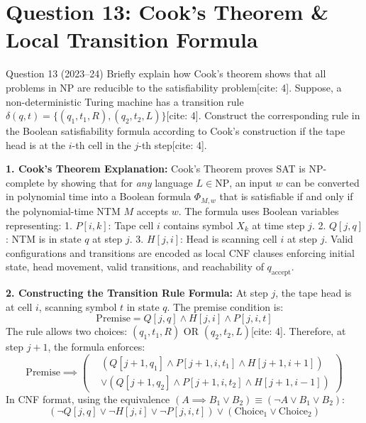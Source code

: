 \documentclass[11pt,a4paper]{article}
\begin{document}
\section{Question 13: Cook's Theorem \& Local Transition Formula}
\begin{questionbox}{Question 13 (2023--24)}
Briefly explain how Cook's theorem shows that all problems in NP are reducible to the satisfiability problem[cite: 4]. Suppose, a non-deterministic Turing machine has a transition rule $\delta(q, t) = \{(q_1, t_1, R), (q_2, t_2, L)\}$[cite: 4]. Construct the corresponding rule in the Boolean satisfiability formula according to Cook's construction if the tape head is at the $i$-th cell in the $j$-th step[cite: 4].
\end{questionbox}

\begin{solutionbox}
\textbf{1. Cook's Theorem Explanation:}
Cook's Theorem proves SAT is NP-complete by showing that for \textit{any} language $L \in \text{NP}$, an input $w$ can be converted in polynomial time into a Boolean formula $\Phi_{M, w}$ that is satisfiable if and only if the polynomial-time NTM $M$ accepts $w$. The formula uses Boolean variables representing:
1. $P[i, k]$: Tape cell $i$ contains symbol $X_k$ at time step $j$.
2. $Q[j, q]$: NTM is in state $q$ at step $j$.
3. $H[j, i]$: Head is scanning cell $i$ at step $j$.
Valid configurations and transitions are encoded as local CNF clauses enforcing initial state, head movement, valid transitions, and reachability of $q_{\text{accept}}$.

\textbf{2. Constructing the Transition Rule Formula:}
At step $j$, the tape head is at cell $i$, scanning symbol $t$ in state $q$. The premise condition is:
$$\text{Premise} = Q[j, q] \land H[j, i] \land P[j, i, t]$$
The rule allows two choices: $(q_1, t_1, R)$ OR $(q_2, t_2, L)$[cite: 4]. Therefore, at step $j+1$, the formula enforces:
$$\text{Premise} \implies \left( \begin{aligned}
& (Q[j+1, q_1] \land P[j+1, i, t_1] \land H[j+1, i+1]) \\
& \lor (Q[j+1, q_2] \land P[j+1, i, t_2] \land H[j+1, i-1])
\end{aligned} \right)$$
In CNF format, using the equivalence $(A \implies B_1 \lor B_2) \equiv (\neg A \lor B_1 \lor B_2)$:
$$(\neg Q[j, q] \lor \neg H[j, i] \lor \neg P[j, i, t]) \lor \left( \text{Choice}_1 \lor \text{Choice}_2 \right)$$
\end{solutionbox}

\end{document}
